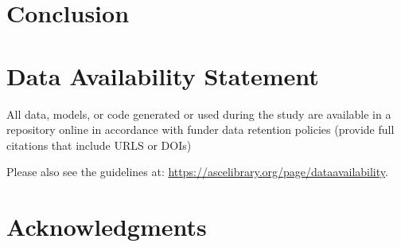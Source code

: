 \documentclass[Journal,letterpaper, SingleSpace, InsideFigs]{ascelike-new}
\begin{document}
\section{Conclusion}

\section{Data Availability Statement}
All data, models, or code generated or used during the study are available in a repository online in accordance with funder data retention policies (provide full citations that include URLS or DOIs)

Please also see the guidelines at: \url{https://ascelibrary.org/page/dataavailability}.

\section{Acknowledgments}

\appendix

   
\end{document}
